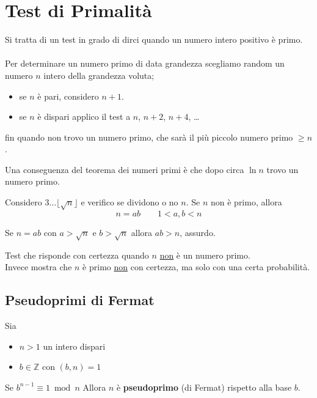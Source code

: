 \documentclass[a4paper,12pt, oneside]{book}
\begin{document}
	\section{Test di Primalità}
		Si tratta di un test in grado di dirci quando un numero intero positivo è primo.\\\\
		Per determinare un numero primo di data grandezza scegliamo random un numero $n$ intero della grandezza voluta;
		\begin{itemize}
			\item se $n$ è pari, considero $n+1$.
			\item se $n$ è dispari applico il test a $n$, $n+2$, $n+4$, \dots
		\end{itemize}
		fin quando non trovo un numero primo, che sarà il più piccolo numero primo $\geq n$.\\
		
		\begin{osservazione}
			Una conseguenza del teorema dei numeri primi è che dopo circa $\ln n$ trovo un numero primo.
		\end{osservazione}
		
		\begin{definizione}
			Considero $3 \dots \lfloor \sqrt{n} \rfloor$
			e verifico se dividono o no $n$.
			Se $n$ non è primo, allora 
			$$n = ab \qquad 1 < a,b < n $$
		\end{definizione}
		\begin{nota}
			Se $n = ab$ con $a>\sqrt{n}$ e $b>\sqrt{n}$ allora $ab>n$, assurdo.
		\end{nota}
		
		\begin{definizione}
			Test che risponde con certezza quando $n$ \underline{non} è un numero primo. \\
			Invece mostra che $n$ è primo \underline{non} con certezza, ma solo con una certa probabilità.
		\end{definizione}
	
		\subsection{Pseudoprimi di Fermat}
			
			\begin{definizione}
				Sia \begin{itemize}
					\item $n>1$ un intero dispari
					\item $b \in \mathbb{Z}$ con $(b,n)=1$
				\end{itemize}
				Se $b^{n-1} \equiv 1 \bmod n$
				Allora $n$ è \textbf{pseudoprimo} (di Fermat) rispetto alla base $b$.
			\end{definizione}
			
\end{document}
